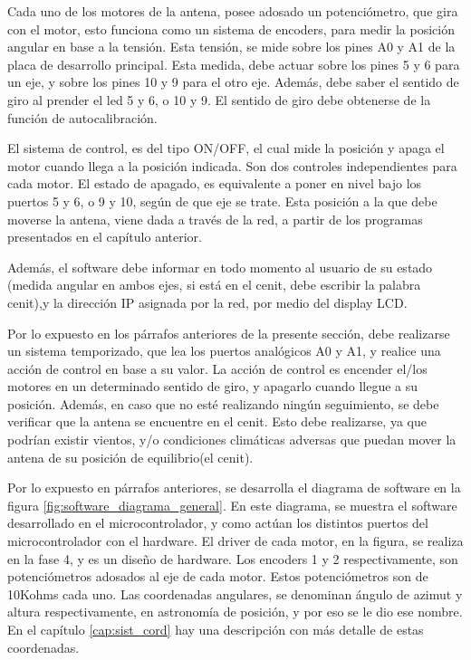 Cada uno de los motores de la antena, posee adosado un potenciómetro, que gira con el motor, esto funciona como un sistema de encoders, para medir la posición angular en base a la tensión. Esta tensión, se mide sobre los pines A0 y A1 de la placa de desarrollo principal. Esta medida, debe actuar sobre los pines 5 y 6 para un eje, y sobre los pines 10 y 9 para el otro eje. Además, debe saber el sentido de giro al prender el led 5 y 6, o 10 y 9. El sentido de giro debe obtenerse de la función de autocalibración.  

El sistema de control, es del tipo ON/OFF, el cual mide la posición y apaga el motor cuando llega a la posición indicada. Son dos controles independientes para cada motor. El estado de apagado, es equivalente a poner en nivel bajo los puertos 5 y 6, o 9 y 10, según  de que eje se trate. Esta posición a la que debe moverse la antena, viene dada a través de la red, a partir de los programas presentados en el capítulo anterior. 

Además, el software debe informar en todo momento al usuario de su estado (medida angular en ambos ejes, si está en el cenit, debe escribir la palabra cenit),y la dirección IP asignada por la red, por medio del display LCD.  

Por lo expuesto en los párrafos anteriores de la presente sección, debe realizarse un sistema temporizado, que lea los puertos analógicos A0 y A1, y realice una acción de control en base a su valor. La acción de control es encender el/los motores en un determinado sentido de giro, y apagarlo cuando llegue a su posición. Además, en caso que no esté realizando ningún seguimiento, se debe verificar que la antena se encuentre en el cenit. Esto debe realizarse, ya que podrían existir vientos, y/o condiciones climáticas adversas que puedan mover la antena de su posición de equilibrio(el cenit). 


Por lo expuesto en párrafos anteriores, se desarrolla el diagrama de software en la figura  \ref{fig:software_diagrama_general}. En este diagrama, se muestra el software desarrollado en el microcontrolador, y como actúan los distintos puertos del microcontrolador con el hardware. El driver de cada motor, en la figura, se realiza en la fase 4, y es un diseño de hardware. Los encoders 1 y 2 respectivamente, son potenciómetros adosados al eje de cada motor. Estos potenciómetros son de 10Kohms cada uno. Las coordenadas angulares, se denominan ángulo de azimut y altura respectivamente, en astronomía de posición, y por eso se le dio ese nombre. En el capítulo \ref{cap:sist_cord} hay una descripción con más detalle de estas coordenadas. 

